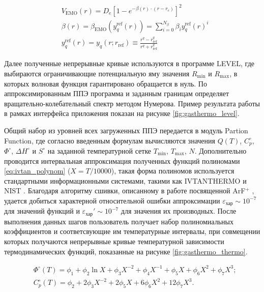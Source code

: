 \documentclass[12pt]{extarticle}
\begin{document}
	\begin{equation}\label{eq:emo}
		\begin{split}
			&V_\text{EMO}(r)=D_e\left[1-e^{-\beta(r) \cdot\left(r-r_e\right)}\right]^2 \\
			&\beta(r)=\beta_\text{EMO}\left(y_q^{\text {ref}}(r)\right)=\sum_{i=0}^{N_\beta} \beta_i y_q^{\text{ref}}(r)^i \\
			& y_q^{\mathrm{ref}}(r)=y_q\left(r ; r_{\mathrm{ref}}\right) \equiv \frac{r^q-r_{\mathrm{ref}}^q}{r^q+r_{\mathrm{ref}}^q}
		\end{split}
	\end{equation}
	
	Далее полученные непрерывные кривые используются в программе LEVEL, где выбираются ограничивающие потенциальную яму значения $R_\text{min}$ и $R_\text{max}$, в которых волновая функция гарантировано обращается в нуль. По аппроксимированным ППЭ программа и заданным границам определяет вращательно-колебательный спектр методом Нумерова. Пример результата работы в рамках интерфейса приложения показан на рисунке \ref{fig:gasthermo_level}.
	
	Общий набор из уровней всех загруженных ППЭ передается в модуль Partion Function, где согласно введенным формулам вычисляются значения $Q(T)$, $C_p^\circ$, $\Phi^\circ$, $\Delta H^\circ$ и $S^\circ$ на заданной температурной сетке $T_\text{min}$, $T_\text{max}$, $N$. Дополнительно проводится интервальная аппроксимация полученных функций полиномами \ref{eq:ivtan_polynom} ($X = T/10000$), такая форма полиномов используется стандартными информационными системами, такими как IVTANTHERMO \cite{Gurvich,Belov_ivtanthermo} и NIST \cite{Linstrom-2001}. Благодаря алгоритму сшивки, описанному в работе посвященной ArF$^+$ \cite{joint_approx}, удается добиться характерной относительной ошибки аппроксимации $\varepsilon_\text{хар} \sim 10^{-7}$ для значений функций и $\varepsilon_\text{хар}' \sim 10^{-7}$ для значения их производных. После выполнения данных шагов пользователь получает набор полиномиальных коэффициентов и соответсвующие им температурные интервалы, при совмещении которых получаются непрерывные кривые температурной зависимости термодинамических функций, показанные на рисунке \ref{fig:gasthermo_thermo}.
	
	\begin{equation}\label{eq:ivtan_polynom}
		\begin{split}
			&\Phi^{\circ}(T)=\phi_1+\phi_2 \ln X+\phi_3 X^{-2}+\phi_4 X^{-1}+\phi_5 X+\phi_6 X^2+\phi_7 X^3 ; \\
			&C_p^{\circ}(T)=\phi_2+2 \phi_3 X^{-2}+2 \phi_5 X+6 \phi_6 X^2+12 \phi_7 X^3 .
		\end{split}
	\end{equation}
	
\end{document}

